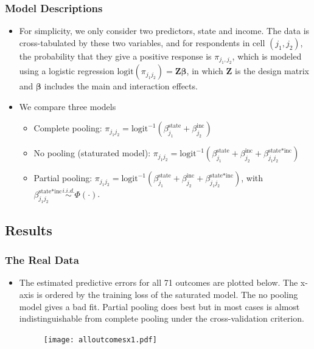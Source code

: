 \documentclass[xetex,mathserif,serif]{beamer}
\begin{document}
\begin{frame}
  \frametitle{Model Descriptions}
  \begin{itemize}
  \item For simplicity, we only consider two predictors, state and income. The
    data is cross-tabulated by these two variables, and for respondents in cell
    $(j_1,j_2)$, the probability that they give a positive response is
    $\pi_{j_1,j_2}$, which is modeled using a logistic regression
    $\text{logit}(\pi_{j_1j_2})=\bm Z\bm\beta$, in which $\bm Z$ is the design
    matrix and $\bm\beta$ includes the main and interaction effects.
  \item We compare three models
    \begin{itemize}
    \item Complete pooling:
      $    \pi_{j_1j_2}=\text{logit}^{-1}\left(\beta^{\text{state}}_{j_1}+\beta^{\text{inc}}_{j_2}\right)$
    \item No pooling (staturated model): $
      \pi_{j_1j_2}=\text{logit}^{-1}\left(\beta^{\text{state}}_{j_1}+\beta^{\text{inc}}_{j_2}+\beta^{\text{state*inc}}_{j_1j_2}\right)$
    \item
      Partial pooling:
      $ \pi_{j_1j_2}=\text{logit}^{-1}\left(\beta^{\text{state}}_{j_1}+\beta^{\text{inc}}_{j_2}+\beta^{\text{state*inc}}_{j_1j_2}\right)$, with
      $\beta^{\text{state*inc}}_{j_1j_2}\stackrel{i.i.d.}{\sim} \Phi(\cdot)$.
    \end{itemize}
  \end{itemize}
\end{frame}
\subsection{Results}
\begin{frame}
  \frametitle{The Real Data}
  \begin{itemize}
  \item The estimated predictive errors for all 71 outcomes are plotted
    below. The x-axis is ordered by the training loss of the saturated model. The
    no pooling model gives a bad fit.  Partial pooling does best but in most
    cases is almost indistinguishable from complete pooling under the
    cross-validation criterion.
    \begin{figure}[htbp]
      \centering
      \texttt{[image: alloutcomesx1.pdf]}
    \end{figure}
  \end{itemize}
\end{frame}
\end{document}
